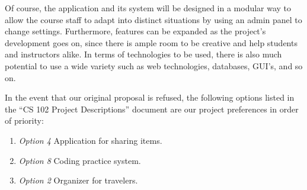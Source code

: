 \documentclass[12pt]{article}
\begin{document}
    \noindent Of course, the application and its system will be designed in a modular
    way to allow the course staff to adapt into distinct situations by using
    an admin panel to change settings. Furthermore, features can be expanded
    as the project's development goes on, since there is ample room to be
    creative and help students and instructors alike. In terms of
    technologies to be used, there is also much potential to use a wide
    variety such as web technologies, databases, GUI's, and so on. \newline
    
    \noindent In the event that our original proposal is refused, the following
    options listed in the ``CS 102 Project Descriptions'' document are our
    project preferences in order of priority:
    
    \begin{enumerate}
        \itemsep1pt\parskip0pt
        \item \textit{Option 4} \rightarrow \textnormal{Application for sharing items.}\)
        \item \textit{Option 8} \rightarrow \textnormal{Coding practice system.}\)
        \item \textit{Option 2} \rightarrow \textnormal{Organizer for travelers.}\)
    \end{enumerate}
    
\end{document}
